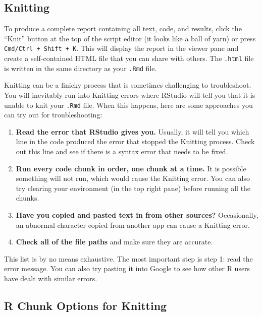 \documentclass[]{book}
\providecommand{\tightlist}{%
  \setlength{\itemsep}{0pt}\setlength{\parskip}{0pt}}
\begin{document}
\subsection{Knitting}\label{knitting}

To produce a complete report containing all text, code, and results,
click the ``Knit'' button at the top of the script editor (it looks like
a ball of yarn) or press \texttt{Cmd/Ctrl\ +\ Shift\ +\ K}. This will
display the report in the viewer pane and create a self-contained HTML
file that you can share with others. The \texttt{.html} file is written
in the same directory as your \texttt{.Rmd} file.

Knitting can be a finicky process that is sometimes challenging to
troubleshoot. You will inevitably run into Knitting errors where RStudio
will tell you that it is unable to knit your \texttt{.Rmd} file. When
this happens, here are some approaches you can try out for
troubleshooting:

\begin{enumerate}
\def\labelenumi{\arabic{enumi}.}
\tightlist
\item
  \textbf{Read the error that RStudio gives you.} Usually, it will tell
  you which line in the code produced the error that stopped the
  Knitting process. Check out this line and see if there is a syntax
  error that needs to be fixed.
\item
  \textbf{Run every code chunk in order, one chunk at a time.} It is
  possible something will not run, which would cause the Knitting error.
  You can also try clearing your environment (in the top right pane)
  before running all the chunks.
\item
  \textbf{Have you copied and pasted text in from other sources?}
  Occasionally, an abnormal character copied from another app can cause
  a Knitting error.
\item
  \textbf{Check all of the file paths} and make sure they are accurate.
\end{enumerate}

This list is by no means exhaustive. The most important step is step 1:
read the error message. You can also try pasting it into Google to see
how other R users have dealt with similar errors.

\subsection{R Chunk Options for
Knitting}\label{r-chunk-options-for-knitting}
\end{document}

